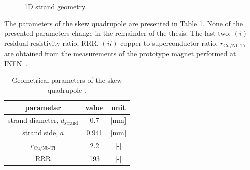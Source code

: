 \begin{figure}[H]
    \centering
    \caption{1D strand geometry.}
    \label{fig: 1d_strand_geometry}
\end{figure}

The parameters of the skew quadrupole are presented in Table \ref{table:skew_quad_params_table_basic}. None of the presented parameters change in the remainder of the thesis. The last two: $(i)$ residual resistivity ratio, RRR, $(ii)$ copper-to-superconductor ratio, $r_\text{Cu/Nb-Ti}$ are obtained from the measurements of the prototype magnet performed at INFN~\cite{marco_prioli_mails}.

\begin{table}[H]
    \caption{Geometrical parameters of the skew quadrupole \cite{marco_prioli_mails, hl_lhc_tech_design_report_v01}.} 
    \vspace{-1.em} 
    \fontsize{10}{10}
    \selectfont 
    \renewcommand{\arraystretch}{1.5}
    \begin{center}
    \begin{tabular}{ ccc }  
    \hline
    parameter & value & unit \\
    \hline
    strand diameter, $d_\text{strand}$ & 0.7 & [mm] \\
    strand side, $a$ & 0.941 & [mm] \\
    $r_\text{Cu/Nb-Ti}$ & 2.2 & [-] \\
    RRR & 193 & [-] \\  
    \hline 
    \end{tabular}
    \end{center}  
     \label{table:skew_quad_params_table_basic} 
 \end{table}
